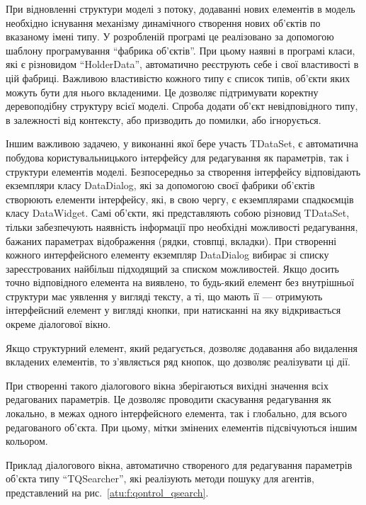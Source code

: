 При відновленні структури моделі з потоку, додаванні
нових елементів в модель необхідно існування механізму динамічного
створення нових об'єктів по вказаному імені типу. У розробленій програмі
це реалізовано за допомогою шаблону програмування ``фабрика об'єктів''.
При цьому наявні в програмі класи, які є різновидом
``HolderData'', автоматично реєструють себе і свої властивості
в цій фабриці. Важливою властивістю кожного типу є список
типів, об'єкти яких можуть бути для нього вкладеними. Це
дозволяє підтримувати коректну деревоподібну структуру всієї
моделі. Спроба додати об'єкт невідповідного типу, в залежності
від контексту, або призводить до помилки, або ігнорується.

Іншим важливою задачею, у виконанні якої бере участь TDataSet,
є автоматична побудова користувальницького інтерфейсу
для редагування як параметрів, так і структури елементів
моделі. Безпосередньо за створення інтерфейсу відповідають
екземпляри класу DataDialog, які за допомогою своєї фабрики об'єктів
створюють елементи інтерфейсу, які, в свою чергу, є екземплярами
спадкоємців класу DataWidget. Самі об'єкти, які представляють собою
різновид TDataSet, тільки забезпечують наявність інформації про необхідні
можливості редагування, бажаних параметрах відображення
(рядки, стовпці, вкладки). При створенні кожного интерфейсного
елементу екземпляр DataDialog вибирає зі списку зареєстрованих
найбільш підходящий за списком можливостей. Якщо досить точно
відповідного елемента на виявлено, то будь-який елемент без
внутрішньої структури має уявлення у вигляді тексту, а ті, що мають її
--- отримують інтерфейсний елемент у вигляді кнопки, при натисканні
на яку відкривається окреме діалогової вікно.

Якщо структурний елемент, який редагується, дозволяє додавання
або видалення вкладених елементів, то з'являється ряд кнопок,
що дозволяє реалізувати ці дії.

При створенні такого діалогового вікна зберігаються
вихідні значення всіх редагованих параметрів. Це дозволяє
проводити скасування редагування як локально, в межах одного
інтерфейсного елемента, так і глобально, для всього редагованого
об'єкта. При цьому, мітки змінених елементів підсвічуються
іншим кольором.

Приклад діалогового вікна, автоматично створеного для
редагування параметрів об'єкта типу ``TQSearcher'', які реалізують
методи пошуку для агентів, представлений на рис.~\ref{atu:f:qontrol_qsearch}.


